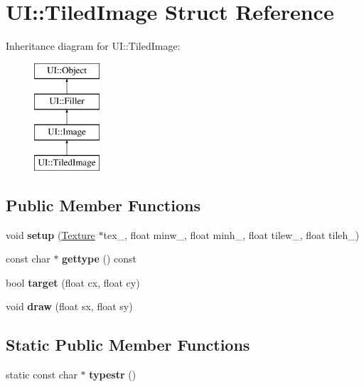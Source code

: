 \hypertarget{struct_u_i_1_1_tiled_image}{}\section{UI\+:\+:Tiled\+Image Struct Reference}
\label{struct_u_i_1_1_tiled_image}
Inheritance diagram for UI\+:\+:Tiled\+Image\+:\begin{figure}[H]
\begin{center}
\leavevmode
\includegraphics[height=4.000000cm]{struct_u_i_1_1_tiled_image}
\end{center}
\end{figure}
\subsection*{Public Member Functions}
\begin{DoxyCompactItemize}
\item 
\mbox{\label{struct_u_i_1_1_tiled_image_a51c00943925a2fa79ab1ecbedf3f866f}} 
void {\bfseries setup} (\hyperlink{struct_texture}{Texture} $\ast$tex\+\_\+, float minw\+\_, float minh\+\_, float tilew\+\_, float tileh\+\_)
\item 
\mbox{\label{struct_u_i_1_1_tiled_image_ab2c291e396117436bde08d6d542f90ac}} 
const char $\ast$ {\bfseries gettype} () const
\item 
\mbox{\label{struct_u_i_1_1_tiled_image_aacdcc66e6ef825a24e4fb56dd021e353}} 
bool {\bfseries target} (float cx, float cy)
\item 
\mbox{\label{struct_u_i_1_1_tiled_image_a10140462ef3aa8a5020f97085f6be7fb}} 
void {\bfseries draw} (float sx, float sy)
\end{DoxyCompactItemize}
\subsection*{Static Public Member Functions}
\begin{DoxyCompactItemize}
\item 
\mbox{\label{struct_u_i_1_1_tiled_image_af93906721b2ba2ef9306f6309fa81b11}} 
static const char $\ast$ {\bfseries typestr} ()
\end{DoxyCompactItemize}

